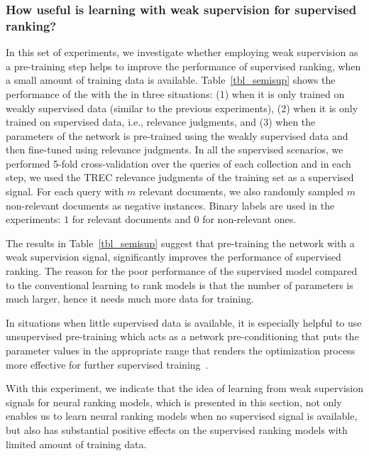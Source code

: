 
\subsubsection{How useful is learning with weak supervision for supervised ranking?}
%
In this set of experiments, we investigate whether employing weak supervision as a pre-training step helps to improve the performance of supervised ranking, when a small amount of training data is available. Table~\ref{tbl_semisup} shows the performance of the \modelthree with the \feedthree in three situations: (1) when it is only trained on weakly supervised data (similar to the previous experiments), (2) when it is only trained on supervised data, i.e., relevance judgments, and (3) when the parameters of the network is pre-trained using the weakly supervised data and then fine-tuned using relevance judgments.
%
In all the supervised scenarios, we performed 5-fold cross-validation over the queries of each collection and in each step, we used the TREC relevance judgments of the training set as a supervised signal. For each query with $m$ relevant documents, we also randomly sampled $m$ non-relevant documents as negative instances. Binary labels are used in the experiments: $1$ for relevant documents and $0$ for non-relevant ones.

The results in Table~\ref{tbl_semisup} suggest that pre-training the network with a weak supervision signal, significantly improves the performance of supervised ranking.
%
The reason for the poor performance of the supervised model compared to the conventional learning to rank models is that the number of parameters is much larger, hence it needs much more data for training.

In situations when little supervised data is available, it is especially helpful to use unsupervised pre-training which acts as a network pre-conditioning that puts the parameter values in the appropriate range that renders the optimization process more effective for further supervised training~\citep{Rrhan:2010}.

With this experiment, we indicate that the idea of learning from weak supervision signals for neural ranking models, which is presented in this section, not only enables us to learn neural ranking models when no supervised signal is available, but also has substantial positive effects on the supervised ranking models with limited amount of training data. 